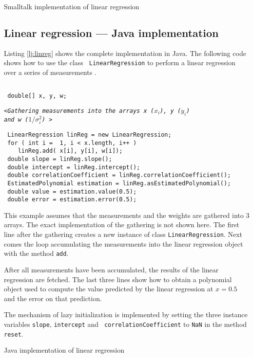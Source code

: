 \documentclass[twoside]{book}
\begin{document}
\begin{listing} Smalltalk implementation of linear regression \label{ls:linreg}

\end{listing}

\subsection{Linear regression --- Java  implementation}
Listing \ref{lj:linreg} shows the complete implementation in Java.
The following code shows how to use the class {\tt
LinearRegression} to perform a linear regression over a series of
measurements .
\begin{codeExample}
\begin{verbatim}

 double[] x, y, w;
\end{verbatim}
\hfil{\tt<\sl Gathering measurements into the arrays {\tt x}
($x_i$), {\tt y} ($y_i$)\hfil \\ \hfil and {\tt w}
($1/\sigma^2_i$)\tt
>}\hfil
\begin{verbatim}
 LinearRegression linReg = new LinearRegression;
 for ( int i =  1, i < x.length, i++ )
    linReg.add( x[i], y[i], w[i]);
 double slope = linReg.slope();
 double intercept = linReg.intercept();
 double correlationCoefficient = linReg.correlationCoefficient();
 EstimatedPolynomial estimation = linReg.asEstimatedPolynomial();
 double value = estimation.value(0.5);
 double error = estimation.error(0.5);
\end{verbatim}
\end{codeExample}
This example assumes that the measurements and the weights are
gathered into 3 arrays. The exact implementation of the gathering
is not shown here. The first line after the gathering creates a
new instance of class {\tt LinearRegression}. Next comes the loop
accumulating the measurements into the linear regression object
with the method {\tt add}.

After all measurements have been accumulated, the results of the
linear regression are fetched. The last three lines show how to
obtain a polynomial object used to compute the value predicted by
the linear regression at $x=0.5$ and the error on that prediction.

The mechanism of lazy initialization is implemented by setting the
three instance variables {\tt slope}, {\tt intercept} and {\tt
correlationCoefficient} to {\tt NaN} in the method {\tt reset}.

\begin{listing} Java implementation of linear regression \label{lj:linreg}

\end{listing}
\end{document}
